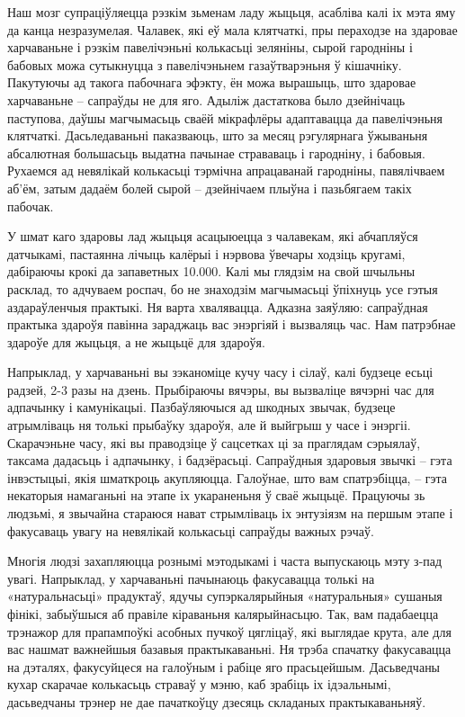 Наш мозг супраціўляецца рэзкім зьменам ладу жыцьця, асабліва калі іх мэта яму да канца незразумелая. Чалавек, які еў мала клятчаткі, пры пераходзе на здаровае харчаваньне і рэзкім павелічэньні колькасьці зеляніны, сырой гародніны і бабовых можа сутыкнуцца з павелічэньнем газаўтварэньня ў кішачніку. Пакутуючы ад такога пабочнага эфэкту, ён можа вырашыць, што здаровае харчаваньне – сапраўды не для яго. Адыліж дастаткова было дзейнічаць паступова, даўшы магчымасьць сваёй мікрафлёры адаптавацца да павелічэньня клятчаткі. Дасьледаваньні паказваюць, што за месяц рэгулярнага ўжываньня абсалютная большасьць выдатна пачынае страваваць і гародніну, і бабовыя. Рухаемся ад невялікай колькасьці тэрмічна апрацаванай гародніны, павялічваем аб'ём, затым дадаём болей сырой – дзейнічаем плыўна і пазьбягаем такіх пабочак.

У шмат каго здаровы лад жыцьця асацыюецца з чалавекам, які абчапляўся датчыкамі, пастаянна лічыць калёрыі і нэрвова ўвечары ходзіць кругамі, дабіраючы крокі да запаветных 10.000. Калі мы глядзім на свой шчыльны расклад, то адчуваем роспач, бо не знаходзім магчымасьці ўпіхнуць усе гэтыя аздараўленчыя практыкі. Ня варта хвалявацца. Адказна заяўляю: сапраўдная практыка здароўя павінна зараджаць вас энэргіяй і вызваляць час. Нам патрэбнае здароўе для жыцьця, а не жыцьцё для здароўя.

Напрыклад, у харчаваньні вы зэканоміце кучу часу і сілаў, калі будзеце есьці радзей, 2-3 разы на дзень. Прыбіраючы вячэры, вы вызваліце вячэрні час для адпачынку і камунікацыі. Пазбаўляючыся ад шкодных звычак, будзеце атрымліваць ня толькі прыбаўку здароўя, але й выйгрыш у часе і энэргіі. Скарачэньне часу, які вы праводзіце ў сацсетках ці за праглядам сэрыялаў, таксама дадасьць і адпачынку, і бадзёрасьці. Сапраўдныя здаровыя звычкі – гэта інвэстыцыі, якія шматкроць акупляюцца. Галоўнае, што вам спатрэбіцца, – гэта некаторыя намаганьні на этапе іх укараненьня ў сваё жыцьцё. Працуючы зь людзьмі, я звычайна стараюся нават стрымліваць іх энтузіязм на першым этапе і факусаваць увагу на невялікай колькасьці сапраўды важных рэчаў.

Многія людзі захапляюцца рознымі мэтодыкамі і часта выпускаюць мэту з-пад увагі. Напрыклад, у харчаваньні пачынаюць факусавацца толькі на «натуральнасьці» прадуктаў, ядучы супэркалярыйныя «натуральныя» сушаныя фінікі, забыўшыся аб правіле кіраваньня калярыйнасьцю. Так, вам падабаецца трэнажор для прапампоўкі асобных пучкоў цягліцаў, які выглядае крута, але для вас нашмат важнейшыя базавыя практыкаваньні. Ня трэба спачатку факусавацца на дэталях, факусуйцеся на галоўным і рабіце яго прасьцейшым. Дасьведчаны кухар скарачае колькасьць страваў у мэню, каб зрабіць іх ідэальнымі, дасьведчаны трэнер не дае пачаткоўцу дзесяць складаных практыкаваньняў.

